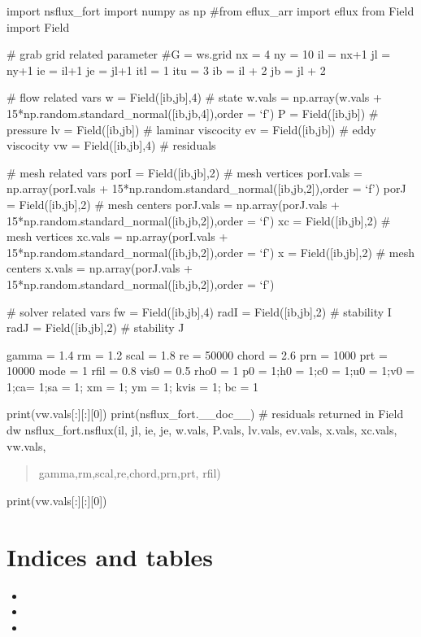 \documentclass[letterpaper,10pt,english]{sphinxmanual}
\begin{document}
\sphinxAtStartPar
import nsflux\_fort
import numpy as np
\#from eflux\_arr import eflux
from Field import Field

\sphinxAtStartPar
\# grab grid related parameter
\#G = ws.grid
nx = 4
ny = 10
il = nx+1
jl = ny+1
ie = il+1
je = jl+1
itl = 1
itu = 3
ib = il + 2
jb = jl + 2

\sphinxAtStartPar
\# flow related vars
w = Field({[}ib,jb{]},4) \# state
w.vals = np.array(w.vals + 15*np.random.standard\_normal({[}ib,jb,4{]}),order = ‘f’)
P = Field({[}ib,jb{]}) \# pressure
lv = Field({[}ib,jb{]}) \# laminar viscocity
ev = Field({[}ib,jb{]}) \# eddy viscocity
vw = Field({[}ib,jb{]},4) \# residuals

\sphinxAtStartPar
\# mesh related vars
porI = Field({[}ib,jb{]},2) \# mesh vertices
porI.vals = np.array(porI.vals + 15*np.random.standard\_normal({[}ib,jb,2{]}),order = ‘f’)
porJ = Field({[}ib,jb{]},2) \# mesh centers
porJ.vals = np.array(porJ.vals + 15*np.random.standard\_normal({[}ib,jb,2{]}),order = ‘f’)
xc = Field({[}ib,jb{]},2) \# mesh vertices
xc.vals = np.array(porI.vals + 15*np.random.standard\_normal({[}ib,jb,2{]}),order = ‘f’)
x = Field({[}ib,jb{]},2) \# mesh centers
x.vals = np.array(porJ.vals + 15*np.random.standard\_normal({[}ib,jb,2{]}),order = ‘f’)

\sphinxAtStartPar
\# solver related vars
fw = Field({[}ib,jb{]},4)
radI = Field({[}ib,jb{]},2) \# stability I
radJ = Field({[}ib,jb{]},2) \# stability J

\sphinxAtStartPar
gamma = 1.4
rm = 1.2
scal = 1.8
re = 50000
chord = 2.6
prn = 1000
prt = 10000
mode = 1
rfil = 0.8
vis0 = 0.5
rho0 = 1
p0 = 1;h0 = 1;c0 = 1;u0 = 1;v0 = 1;ca= 1;sa = 1; xm = 1; ym = 1; kvis = 1; bc = 1

\sphinxAtStartPar
print(vw.vals{[}:{]}{[}:{]}{[}0{]})
print(nsflux\_fort.\_\_doc\_\_)
\# residuals returned in Field dw
nsflux\_fort.nsflux(il, jl, ie, je,       w.vals, P.vals, lv.vals, ev.vals,        x.vals, xc.vals,       vw.vals,
\begin{quote}

\sphinxAtStartPar
gamma,rm,scal,re,chord,prn,prt,       rfil)
\end{quote}

\sphinxAtStartPar
print(vw.vals{[}:{]}{[}:{]}{[}0{]})


\chapter{Indices and tables}
\label{\detokenize{index:indices-and-tables}}\begin{itemize}
\item {} 
\sphinxAtStartPar
{}

\item {} 
\sphinxAtStartPar
{}

\item {} 
\sphinxAtStartPar
{}

\end{itemize}
\end{document}

